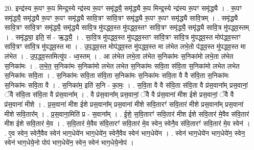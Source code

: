 \documentclass[17pt]{extarticle}
\begin{document}
20. इन्द्र॑स्य रू॒पꣳ रू॒प मिन्द्र॒स्ये न्द्र॑स्य रू॒पꣳ समृ॑द्ध्यै॒ समृ॑द्ध्यै रू॒प मिन्द्र॒स्ये न्द्र॑स्य रू॒पꣳ समृ॑द्ध्यै । . रू॒पꣳ समृ॑द्ध्यै॒ समृ॑द्ध्यै रू॒पꣳ रू॒पꣳ समृ॑द्ध्यै सावि॒त्रꣳ सा॑वि॒त्रꣳ समृ॑द्ध्यै रू॒पꣳ रू॒पꣳ समृ॑द्ध्यै सावि॒त्रम् । . समृ॑द्ध्यै सावि॒त्रꣳ सा॑वि॒त्रꣳ समृ॑द्ध्यै॒ समृ॑द्ध्यै सावि॒त्र मु॑पद्ध्व॒स्त मु॑पद्ध्व॒स्तꣳ सा॑वि॒त्रꣳ समृ॑द्ध्यै॒ समृ॑द्ध्यै सावि॒त्र मु॑पद्ध्व॒स्तम् । . समृ॑द्ध्या॒ इति॒ सं - ऋ॒द्ध्यै॒ । . सा॒वि॒त्र मु॑पद्ध्व॒स्त मु॑पद्ध्व॒स्तꣳ सा॑वि॒त्रꣳ सा॑वि॒त्र मु॑पद्ध्व॒स्त मोप॑द्ध्व॒स्तꣳ सा॑वि॒त्रꣳ सा॑वि॒त्र मु॑पद्ध्व॒स्त मा । . उ॒प॒द्ध्व॒स्त मोप॑द्ध्व॒स्त मु॑पद्ध्व॒स्त मा ल॑भेत लभे॒तो प॑द्ध्व॒स्त मु॑पद्ध्व॒स्त मा ल॑भेत । . उ॒प॒द्ध्व॒स्तमित्यु॑प - ध्व॒स्तम् । . आ ल॑भेत लभे॒ता ल॑भेत स॒निका॑मः स॒निका॑मो लभे॒ता ल॑भेत स॒निका॑मः । . ल॒भे॒त॒ स॒निका॑मः स॒निका॑मो लभेत लभेत स॒निका॑मः सवि॒ता स॑वि॒ता स॒निका॑मो लभेत लभेत स॒निका॑मः सवि॒ता । . स॒निका॑मः सवि॒ता स॑वि॒ता स॒निका॑मः स॒निका॑मः सवि॒ता वै वै स॑वि॒ता स॒निका॑मः स॒निका॑मः सवि॒ता वै । . स॒निका॑म॒ इति॑ स॒नि - का॒मः॒ । . स॒वि॒ता वै वै स॑वि॒ता स॑वि॒ता वै प्र॑स॒वाना᳚म् प्रस॒वानां॒ ॅवै स॑वि॒ता स॑वि॒ता वै प्र॑स॒वाना᳚म् । . वै प्र॑स॒वाना᳚म् प्रस॒वानां॒ ॅवै वै प्र॑स॒वाना॑ मीश ईशे प्रस॒वानां॒ ॅवै वै प्र॑स॒वाना॑ मीशे । . प्र॒स॒वाना॑ मीश ईशे प्रस॒वाना᳚म् प्रस॒वाना॑ मीशे सवि॒तारꣳ॑ सवि॒तार॑ मीशे प्रस॒वाना᳚म् प्रस॒वाना॑ मीशे सवि॒तार᳚म् । . प्र॒स॒वाना॒मिति॑ प्र - स॒वाना᳚म् । . ई॒शे॒ स॒वि॒तारꣳ॑ सवि॒तार॑ मीश ईशे सवि॒तार॑ मे॒वैव स॑वि॒तार॑ मीश ईशे सवि॒तार॑ मे॒व । . स॒वि॒तार॑ मे॒वैव स॑वि॒तारꣳ॑ सवि॒तार॑ मे॒व स्वेन॒ स्वेनै॒व स॑वि॒तारꣳ॑ सवि॒तार॑ मे॒व स्वेन॑ । . ए॒व स्वेन॒ स्वेनै॒वैव स्वेन॑ भाग॒धेये॑न भाग॒धेये॑न॒ स्वेनै॒वैव स्वेन॑ भाग॒धेये॑न । . स्वेन॑ भाग॒धेये॑न भाग॒धेये॑न॒ स्वेन॒ स्वेन॑ भाग॒धेये॒नो पोप॑ भाग॒धेये॑न॒ स्वेन॒ स्वेन॑ भाग॒धेये॒नोप॑ । \newline
\end{document}
